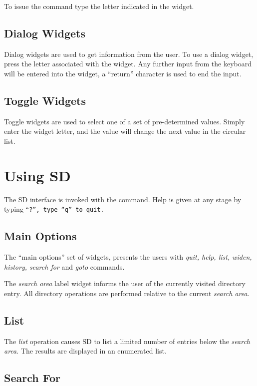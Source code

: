 To issue the command type the letter indicated in
the widget. 

\subsection {Dialog Widgets}

Dialog widgets are used to get information from the user.
To use a dialog widget, press the letter associated with the widget.
Any further input from the keyboard will be entered into the widget,
a ``return'' character is used to end the input.

\subsection {Toggle Widgets}

Toggle widgets are used to select one of a set of pre-determined values.
Simply enter the widget letter, and the value will change the next value in
the circular list.

\section {Using SD}

The SD interface is invoked with the  command.  
Help is given at any stage by typing ``\tt ?\rm '', type ``\tt q\rm '' to quit.

\subsection {Main Options}
The ``main options'' set of widgets,
presents the users with {\em quit, help, list, widen, history, search for} and
{\em goto} commands.

The {\em search area} label widget informs the user of the currently visited
directory entry.
All directory operations are performed relative to the current {\em search
area}.

\subsection {List}

The {\em list} operation causes SD to list a limited number of entries below
the {\em search area}.
The results are displayed in an enumerated list.

\subsection {Search For}

